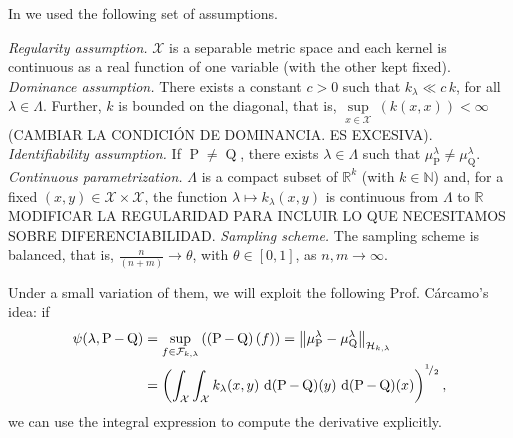 	In \textcite{Carcamo2024} we used the following set of assumptions.
	\begin{description}
		 \textit{Regularity assumption.} $\mathcal{X}$ is a separable metric space and each kernel is continuous as a real function of one variable (with the other kept fixed).
		 \textit{Dominance assumption.} There exists a constant $c>0$ such that $k_{\lambda}\ll c\,k$, for all $\lambda\in\Lambda$. Further, $k$ is bounded on the diagonal, that is, $\underset{x\in\mathcal{X}}{\operatorname{sup}}\,(k(x,x))<\infty$ {\color{orange}(CAMBIAR LA CONDICI\'{O}N DE DOMINANCIA. ES EXCESIVA)}.
		 \textit{Identifiability assumption.} If $\operatorname{P}\neq\operatorname{Q}$, there exists $\lambda\in\Lambda$ such that $\mu_{\operatorname{P}}^{\lambda}\neq\mu_{\operatorname{Q}}^{\lambda}$.
		 \textit{Continuous parametrization.} $\Lambda$ is a compact subset of $\mathbb{R}^{k}$ (with $k\in\mathbb{N}$) and, for a fixed $(x,y)\in\mathcal{X}\times\mathcal{X}$, the function $\lambda\mapsto k_{\lambda}(x,y)$ is continuous from $\Lambda$ to $\mathbb{R}$ {\color{orange} MODIFICAR LA REGULARIDAD PARA INCLUIR LO QUE NECESITAMOS SOBRE DIFERENCIABILIDAD}.
		 \textit{Sampling scheme.} The sampling scheme is balanced, that is, $\frac{n}{(n+m)}\to\theta$, with $\theta\in[0,1]$, as $n,m\to\infty$.
	\end{description}
	Under a small variation of them, we will exploit the following Prof. C\'{a}rcamo's idea: if
	\begin{equation}\label{Eqn:ProfCarcaIdea}
		\begin{aligned}
			\psi(\lambda,\operatorname{P}-\operatorname{Q})&=\underset{f\in\mathcal{F}_{k,\lambda}}{\operatorname{sup}}\,((\operatorname{P}-\operatorname{Q})\,(f))=\left\|\mu_{\operatorname{P}}^{\lambda}-\mu_{\operatorname{Q}}^{\lambda}\right\|_{\mathcal{H}_{k,\lambda}}
			\\&=\left(\int_{\mathcal{X}}\int_{\mathcal{X}}k_{\lambda}(x,y)\,\operatorname{d}(\operatorname{P}-\operatorname{Q})(y)\,\operatorname{d}(\operatorname{P}-\operatorname{Q})(x)\right)^{^{1}\!/_{2}},
		\end{aligned}
	\end{equation}
	we can use the integral expression to compute the derivative explicitly.
	
